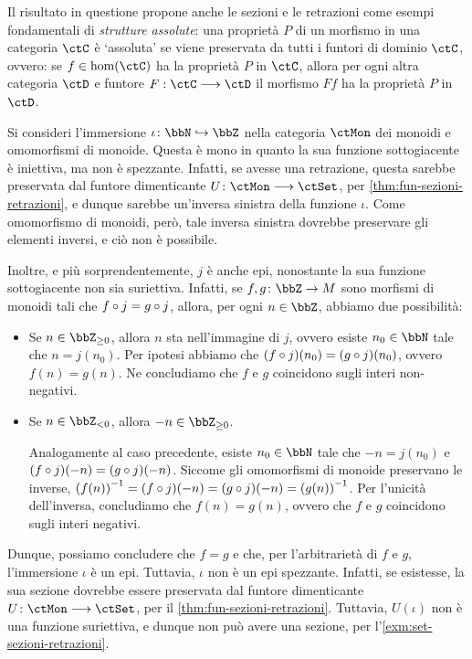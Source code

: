 Il risultato in questione propone anche le sezioni e le retrazioni come esempi fondamentali di \emph{strutture assolute}: una proprietà \(P\) di un morfismo in una categoria \(\ctC\) è `assoluta' se viene preservata da tutti i funtori di dominio \(\ctC\), ovvero: se \(f\in\hom(\ctC)\) ha la proprietà \(P\) in \(\ctC\), allora per ogni altra categoria \(\ctD\) e funtore \(F : \ctC\fun\ctD\) il morfismo \(Ff\) ha la proprietà \(P\) in \(\ctD\).
\begin{example}\label{mono_epi_noniso}
	Si consideri l'immersione \(\iota \colon \bbN \mono \bbZ\)	nella categoria \(\ctMon\) dei monoidi e omomorfismi di monoide.	Questa è mono in quanto la sua funzione sottogiacente è iniettiva,	ma non è spezzante.	Infatti, se avesse una retrazione,	questa sarebbe preservata dal funtore dimenticante \(U \colon \ctMon \fun \ctSet\),	per \ref{thm:fun-sezioni-retrazioni},	e dunque sarebbe un'inversa sinistra della funzione \(\iota\).	Come omomorfismo di monoidi, però, tale inversa sinistra dovrebbe preservare gli elementi inversi,	e ciò non è possibile.

	Inoltre, e più sorprendentemente, \( j\) è anche epi,	nonostante la sua funzione sottogiacente non sia suriettiva.	Infatti, se \(f, g \colon \bbZ \to M\) sono morfismi di monoidi tali che \(f\circ j = g\circ j\),	allora, per ogni \(n \in \bbZ\),	abbiamo due possibilità:
	\begin{itemize}
		\item Se \(n \in \bbZ_{\geq 0}\), allora \(n\) sta nell'immagine di \( j\), ovvero esiste \(n_0 \in \bbN\) tale che \(n =  j(n_0)\). Per ipotesi abbiamo che \((f\circ j) (n_0) = (g\circ j) (n_0)\), ovvero \(f (n) = g (n)\). Ne concludiamo che \(f\) e \(g\) coincidono sugli interi non-negativi.
		\item Se \(n \in \bbZ_{< 0}\), allora \(-n \in \bbZ_{\geq 0}\).

		      Analogamente al caso precedente, esiste \(n_0 \in \bbN\) tale che \(-n =  j(n_0)\) e \((f\circ j) (-n) = (g\circ j) (-n)\). Siccome gli omomorfismi di monoide preservano le inverse, \({(f (n))}^{-1} = (f\circ j) {(-n)} = (g\circ j) (-n) = {(g (n))}^{-1}\). Per l'unicità dell'inversa, concludiamo che \(f (n) = g (n)\), ovvero che \(f\) e \(g\) coincidono sugli interi negativi.
	\end{itemize}
	Dunque, possiamo concludere che \(f = g\) e che, per l'arbitrarietà di \(f\) e \(g\), l'immersione \(\iota\) è un epi. Tuttavia, \(\iota\) non è un epi spezzante. Infatti, se esistesse, la sua sezione dovrebbe essere preservata dal funtore dimenticante \(U \colon \ctMon \fun \ctSet\), per il \autoref{thm:fun-sezioni-retrazioni}. Tuttavia, \(U(\iota)\) non è una funzione suriettiva, e dunque non può avere una sezione, per l'\autoref{exm:set-sezioni-retrazioni}.
\end{example}
